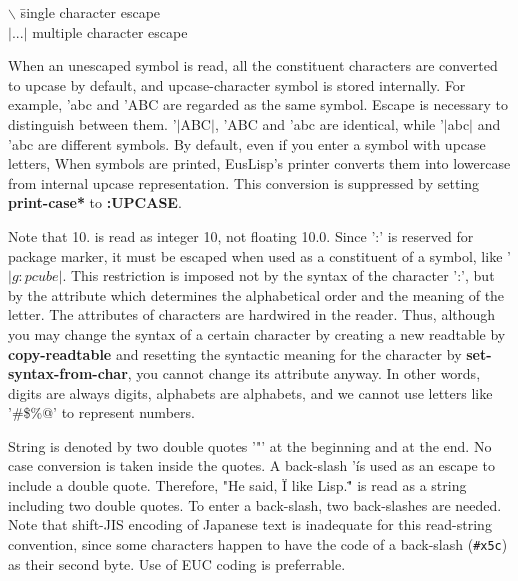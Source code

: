 \begin{tabbing}
{\bf $\backslash$} \hspace{10mm} \=  single character escape \\
{\bf $|...|$} \>  multiple character escape \\
\end{tabbing}

When an unescaped symbol is read,
all the constituent characters are converted to upcase by default,
and upcase-character symbol is stored internally.
For example, 'abc and 'ABC are regarded as the same symbol.
Escape is necessary to distinguish between them.
'$|$ABC$|$, 'ABC and 'abc are identical,
while '$|$abc$|$ and 'abc are different symbols.
By default, even if you enter a symbol with upcase letters,
When symbols are printed,
EusLisp's printer converts them into lowercase from
internal upcase representation.
This conversion is
suppressed by setting {\bf *print-case*} to {\bf :UPCASE}.

Note that 10. is read as integer 10, not floating 10.0.
Since ':' is reserved for package marker, it must be escaped
when used as a constituent of a symbol, like '$|g:pcube|$.
This restriction is imposed not by the syntax of the character ':',
but by the attribute which determines the alphabetical order and the meaning of
the letter.
The attributes of characters are hardwired in the reader.
Thus, although you may change the syntax of a certain character by
creating a new readtable by {\bf copy-readtable} and
resetting the syntactic meaning for the character by {\bf set-syntax-from-char},
you cannot change its attribute anyway. 
In other words, digits are always digits, alphabets are alphabets,
and we cannot use letters like '\#\$\%@' to represent numbers.

String is denoted by two double quotes '"' at the beginning and at the end.
No case conversion is taken inside the quotes.
A back-slash '\' is used as an escape to include a double quote.
Therefore, "He said, \"I like Lisp.\"" is read as a string
including two double quotes.
To enter a back-slash, two back-slashes are needed.
Note that shift-JIS encoding of Japanese text is inadequate for this
read-string convention, since some characters happen to have the
code of a back-slash (\verb+#x5c+) as their second byte.
Use of EUC coding is preferrable.


